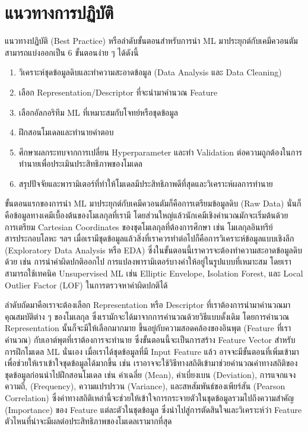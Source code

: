 \section{แนวทางการปฏิบัติ}
\label{sec:pred_best_prac}

แนวทางปฏิบัติ (Best Practice) หรือลำดับขั้นตอนสำหรับการนำ ML มาประยุกต์กับเคมีควอนตัมสามารถแบ่งออกเป็น 6 ขั้นตอนง่าย ๆ ได้ดังนี้
%
\begin{enumerate}[topsep=0pt,noitemsep]\setlength\itemsep{0.5em}
    \item วิเคราะห์ชุดข้อมูลดิบและทำความสะอาดข้อมูล (Data Analysis และ Data Cleaning)

    \item เลือก Representation/Descriptor ที่จะนำมาคำนวณ Feature

    \item เลือกอัลกอริทึม ML ที่เหมาะสมกับโจทย์หรือชุดข้อมูล

    \item ฝึกสอนโมเดลและทำนายคำตอบ

    \item ศึกษาผลกระทบจากการเปลี่ยน Hyperparameter และทำ Validation ต่อความถูกต้องในการทำนายเพื่อประเมินประสิทธิภาพของโมเดล

    \item สรุปปัจจัยและพารามิเตอร์ที่ทำให้โมเดลมีประสิทธิภาพดีที่สุดและวิเคราะห์ผลการทำนาย
\end{enumerate}

ขั้นตอนแรกของการนำ ML มาประยุกต์กับเคมีควอนตัมก็คือการเตรียมข้อมูลดิบ (Raw Data) นั่นก็คือข้อมูลทางเคมีเบื้องต้นของโมเลกุลที่เรามี โดยส่วนใหญ่แล้วนักเคมีเชิงคำนวณมักจะเริ่มต้นด้วยการเตรียม Cartesian Coordinates ของชุดโมเลกุลที่ต้องการศึกษา เช่น โมเลกุลอินทรีย์ สารประกอบโลหะ ฯลฯ เมื่อเรามีชุดข้อมูลแล้วสิ่งที่เราควรทำต่อไปก็คือการวิเคราะห์ข้อมูลแบบเชิงลึก (Exploratory Data Analysis หรือ EDA) ซึ่งในขั้นตอนนี้เราควรจะต้องทำความสะอาดข้อมูลดิบด้วย เช่น การนำค่าผิดปกติออกไป การแปลงพารามิเตอร์บางค่าให้อยู่ในรูปแบบที่เหมาะสม โดยเราสามารถใช้เทคนิค Unsupervised ML เช่น Elliptic Envelope, Isolation Forest, และ Local Outlier Factor (LOF) ในการตรวจหาค่าผิดปกติได้

ลำดับถัดมาคือเราจะต้องเลือก Representation หรือ Descriptor ที่เราต้องการนำมาคำนวณมาคุณสมบัติต่าง ๆ ของโมเลกุล ซึ่งเรามักจะได้มาจากการคำนวณด้วยวิธีแบบดั้งเดิม โดยการคำนวณ Representation นั้นก็จะมีให้เลือกมากมาย ขึ้นอยู่กับความสอดคล้องของอินพุต (Feature ที่เราคำนวณ) กับเอาต์พุตที่เราต้องการจะทำนาย ซึ่งขั้นตอนนี้จะเป็นการสร้าง Feature Vector สำหรับการฝึกโมเดล ML นั่นเอง เมื่อเราได้ชุดข้อมูลที่มี Input Feature แล้ว อาจจะมีขั้นตอนที่เพิ่มเข้ามาเพื่อช่วยให้เราเข้าใจชุดข้อมูลได้มากขึ้น เช่น เราอาจจะใช้วิธีทางสถิติเข้ามาช่วยคำนวณค่าทางสถิติของชุดข้อมูลก่อนนำไปฝึกสอนโมเดล เช่น ค่าเฉลี่ย (Mean), ค่าเบี่ยงเบน (Deviation), การแจกแจงความถี่, (Frequency), ความแปรปรวน (Variance), และสหสัมพันธ์ของเพียร์สัน (Pearson Correlation) ซึ่งค่าทางสถิติเหล่านี้จะช่วยให้เข้าใจการกระจายตัวในชุดข้อมูลรวมไปถึงความสำคัญ (Importance) ของ Feature แต่ละตัวในชุดข้อมูล ซึ่งนำไปสู่การตัดสินใจและวิเคราะห์ว่า Feature ตัวไหนที่น่าจะมีผลต่อประสิทธิภาพของโมเดลเรามากที่สุด

